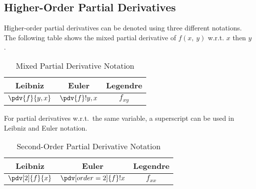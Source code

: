 \documentclass{article}
\begin{document}
\subsection{Higher-Order Partial Derivatives}
\begin{definition}
    Higher-order partial derivatives can be denoted using three
    different notations. The following table shows the mixed partial
    derivative of \(f\left( x,\: y \right)\) w.r.t. \(x\) then \(y\).
    \begin{table}[H]
        \centering
        \begin{tabular}{c c c}
            \toprule
            \textbf{Leibniz}              & \textbf{Euler}    & \textbf{Legendre} \\
            \midrule
            \(\displaystyle\pdv{f}{y,x}\) & \(\pdv{f}!{y,x}\) & \(f_{x y}\)       \\
            \bottomrule
        \end{tabular}
        \caption{Mixed Partial Derivative Notation}
    \end{table}
    For partial derivatives w.r.t.\ the same variable, a superscript can
    be used in Leibniz and Euler notation.
    \begin{table}[H]
        \centering
        \begin{tabular}{c c c}
            \toprule
            \textbf{Leibniz}               & \textbf{Euler}                        & \textbf{Legendre} \\
            \midrule
            \(\displaystyle\pdv[2]{f}{x}\) & \(\displaystyle\pdv[order=2]{f}!{x}\) & \(f_{x x}\)       \\
            \bottomrule
        \end{tabular}
        \caption{Second-Order Partial Derivative Notation}
    \end{table}
\end{definition}
\end{document}
